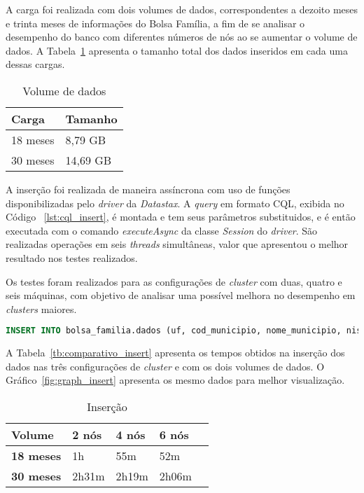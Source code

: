 A carga foi realizada com dois volumes de dados, correspondentes a dezoito meses e trinta meses de informações do Bolsa Família, a fim de se analisar o desempenho do banco com diferentes números de nós ao se aumentar o volume de dados. A Tabela~\ref{tab:volume} apresenta o tamanho total dos dados inseridos em cada uma dessas cargas.

\begin{table}[]
	\centering
	\caption{Volume de dados}
	\label{tab:volume}
	\begin{tabular}{ll}
		\textbf{Carga} & \textbf{Tamanho} \\ \hline
		18 meses     &  8,79 GB              \\ \hline
		30 meses    &  14,69 GB             \\ \hline
	\end{tabular}
\end{table}

A inserção foi realizada de maneira assíncrona com uso de funções disponibilizadas pelo \emph{driver} da \emph{Datastax}. A \emph{query} em formato CQL, exibida no Código ~\ref{lst:cql_insert}, é montada e tem seus parâmetros substituidos, e é então executada com o comando \emph{executeAsync} da classe \emph{Session} do \emph{driver}. São realizadas operações em seis \emph{threads} simultâneas, valor que apresentou o melhor resultado nos testes realizados.

Os testes foram realizados para as configurações de \emph{cluster} com duas, quatro e seis máquinas, com objetivo de analisar uma possível melhora no desempenho em \emph{clusters} maiores.

\begin{lstlisting}[caption={Código CQL para inserção},label={lst:cql_insert},language=SQL]
INSERT INTO bolsa_familia.dados (uf, cod_municipio, nome_municipio, nis_favorecido, nome_favorecido, fonte, valor, periodo) VALUES (?, ?, ?, ?, ?, ?, ?, ?)
\end{lstlisting}

A Tabela~\ref{tb:comparativo_insert} apresenta os tempos obtidos na inserção dos dados nas três configurações de \emph{cluster} e com os dois volumes de dados. O Gráfico~\ref{fig:graph_insert} apresenta os mesmo dados para melhor visualização.


\begin{table}[]
	\centering
	\caption{Inserção}
	\label{tb:tempo_insert}
	\begin{tabular}{lllll}
		\textbf{Volume}		& \textbf{2 nós} & \textbf{4 nós} & \textbf{6 nós} \\ \hline
		\textbf{18 meses}   & 1h         	 & 55m       	  & 52m            \\ \hline
		\textbf{30 meses}   & 2h31m      	 & 2h19m          & 2h06m          \\ \hline
	\end{tabular}
\end{table}

